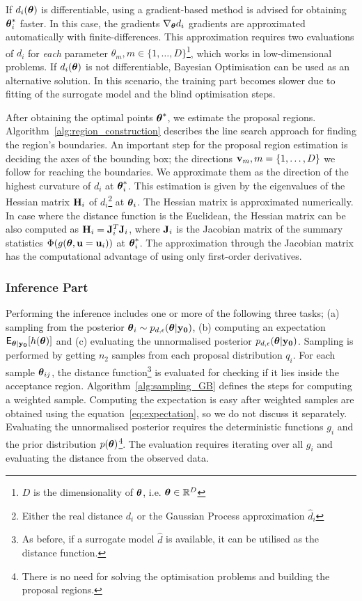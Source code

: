 If \(d_i(\boldsymbol{\theta})\) is differentiable, using a gradient-based method
is advised for obtaining \(\boldsymbol{\theta}_i^*\) faster. In this case, the
gradients \(\nabla_{\boldsymbol{\theta}} d_i\) gradients are approximated
automatically with finite-differences. This approximation requires two
evaluations of \(d_i\) for \emph{each} parameter
\(\theta_m, m \in \{1, \ldots, D\}\)\footnote{\(D\) is the
  dimensionality of \(\boldsymbol{\theta}\), i.e.  \(\boldsymbol{\theta} \in \mathbb{R}^D\)},
which works in low-dimensional problems. If \(d_i(\boldsymbol{\theta})\) is not
differentiable, Bayesian Optimisation can be used as an alternative
solution. In this scenario, the training part becomes slower due to
fitting of the surrogate model and the blind optimisation steps.

After obtaining the optimal points \(\boldsymbol{\theta}^*\), we estimate the
proposal regions. Algorithm~\ref{alg:region_construction} describes
the line search approach for finding the region's boundaries. An
important step for the proposal region estimation is deciding the axes
of the bounding box; the directions \(\mathbf{v}_m, m = \{1, \ldots, D\}\) we
follow for reaching the boundaries. We approximate them as the
direction of the highest curvature of \(d_i\) at \(\boldsymbol{\theta}_i^*\). This
estimation is given by the eigenvalues of the Hessian matrix
\(\mathbf{H}_i\) of \(d_i\)\footnote{Either the real distance \(d_i\) or
  the Gaussian Process approximation \(\hat{d}_i\)} at
\(\boldsymbol{\theta}_i\). The Hessian matrix is approximated numerically. In case
where the distance function is the Euclidean, the Hessian matrix can
be also computed as \(\mathbf{H}_i = \mathbf{J}_i^T\mathbf{J}_i\), where \(\mathbf{J}_i\)
is the Jacobian matrix of the summary statistics
\(\Phi(g(\boldsymbol{\theta}, \mathbf{u}=\mathbf{u}_i))\) at \(\boldsymbol{\theta}_i^*\). The approximation
through the Jacobian matrix has the computational advantage of using
only first-order derivatives.

\subsubsection*{Inference Part}
Performing the inference includes one or more of the following three
tasks; (a) sampling from the posterior
\( \boldsymbol{\theta}_i \sim p_{d, \epsilon}(\boldsymbol{\theta}|\mathbf{y_0})\), (b) computing an
expectation \(\mathsf{E}_{\boldsymbol{\theta}|\mathbf{y_0}}[h(\boldsymbol{\theta})]\) and (c) evaluating the
unnormalised posterior \(p_{d, \epsilon}(\boldsymbol{\theta}|\mathbf{y_0})\). Sampling is
performed by getting \(n_2\) samples from each proposal distribution
\(q_i\). For each sample \(\boldsymbol{\theta}_{ij}\), the distance
function\footnote{As before, if a surrogate model \(\hat{d}\) is
  available, it can be utilised as the distance function.} is
evaluated for checking if it lies inside the acceptance
region. Algorithm~\ref{alg:sampling_GB} defines the steps for
computing a weighted sample. Computing the expectation is easy after
weighted samples are obtained using the equation~\ref{eq:expectation},
so we do not discuss it separately. Evaluating the unnormalised
posterior requires the deterministic functions \(g_i\) and the prior
distribution \(p(\boldsymbol{\theta})\)\footnote{There is no need for solving the
  optimisation problems and building the proposal regions.}. The
evaluation requires iterating over all \(g_i\) and evaluating the
distance from the observed data.

